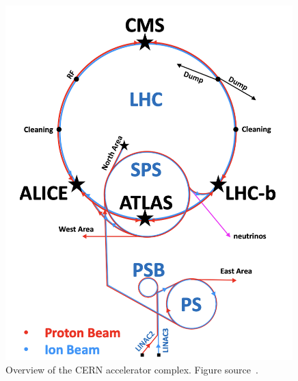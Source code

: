 \begin{figure}[t!]
\centering
\includegraphics[width=0.99\textwidth]{figures/acceleration_chain.png}
\caption[CERN accelerator complex]{Overview of the CERN accelerator complex. Figure source~\cite{SMtable}.}
\label{fig:acceleration_complex}
\end{figure} 
   


